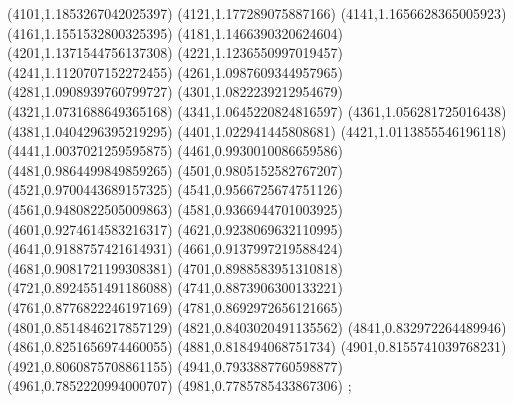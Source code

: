 {(4101,1.1853267042025397)
(4121,1.177289075887166)
(4141,1.1656628365005923)
(4161,1.1551532800325395)
(4181,1.1466390320624604)
(4201,1.1371544756137308)
(4221,1.1236550997019457)
(4241,1.1120707152272455)
(4261,1.0987609344957965)
(4281,1.0908939760799727)
(4301,1.0822239212954679)
(4321,1.0731688649365168)
(4341,1.0645220824816597)
(4361,1.056281725016438)
(4381,1.0404296395219295)
(4401,1.022941445808681)
(4421,1.0113855546196118)
(4441,1.0037021259595875)
(4461,0.9930010086659586)
(4481,0.9864499849859265)
(4501,0.9805152582767207)
(4521,0.9700443689157325)
(4541,0.9566725674751126)
(4561,0.9480822505009863)
(4581,0.9366944701003925)
(4601,0.9274614583216317)
(4621,0.9238069632110995)
(4641,0.9188757421614931)
(4661,0.9137997219588424)
(4681,0.9081721199308381)
(4701,0.8988583951310818)
(4721,0.8924551491186088)
(4741,0.8873906300133221)
(4761,0.8776822246197169)
(4781,0.8692972656121665)
(4801,0.8514846217857129)
(4821,0.8403020491135562)
(4841,0.832972264489946)
(4861,0.8251656974460055)
(4881,0.818494068751734)
(4901,0.8155741039768231)
(4921,0.8060875708861155)
(4941,0.7933887760598877)
(4961,0.7852220994000707)
(4981,0.7785785433867306)
};
